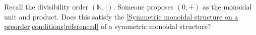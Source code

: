
Recall the divisibility order $(\mathbb{N}, |)$. Someone proposes $(0,+)$ as the monoidal unit and product. Does this satisfy the \ref{Symmetric monoidal structure on a preorder|conditions|referenced} of a symmetric monoidal structure?